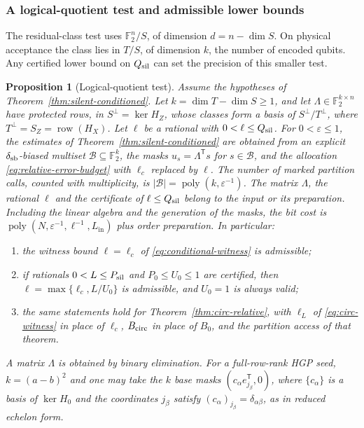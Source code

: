 \documentclass[10pt,twocolumn]{article}
\newtheorem{proposition}[theorem]{Proposition}
\theoremstyle{definition}
\newcommand{\Ftwo}{\mathbb{F}_2}
\DeclareMathOperator{\rowsp}{row}
\DeclareMathOperator{\poly}{poly}
\newcommand{\Lin}{L_{\mathrm{in}}}
\begin{document}
\subsubsection{A logical-quotient test and admissible lower bounds}
\label{sec:logical-quotient}
The residual-class test uses $\Ftwo^n/S$, of dimension $d=n-\dim S$.
On physical acceptance the class lies in $T/S$, of dimension $k$,
the number of encoded qubits. Any certified lower bound on $Q_{\rm sil}$
can set the precision of this smaller test.

\begin{proposition}[Logical-quotient test]\label{prop:logical-quotient}
Assume the hypotheses of Theorem~\ref{thm:silent-conditioned}. Let
$k=\dim T-\dim S\ge1$, and let $\Lambda\in\Ftwo^{k\times n}$ have
protected rows, in $S^\perp=\ker H_Z$, whose classes form a basis of
$S^\perp/T^\perp$, where $T^\perp=S_Z=\rowsp(H_X)$. Let $\ell$ be a
rational with $0<\ell\le Q_{\rm sil}$. For $0<\varepsilon\le1$, the
estimates of Theorem~\ref{thm:silent-conditioned} are obtained from an
explicit $\delta_{\rm sb}$-biased multiset $\mathcal B\subseteq\Ftwo^k$,
the masks $u_s=\Lambda^{\mathsf T}s$ for $s\in\mathcal B$, and the
allocation \eqref{eq:relative-error-budget} with $\ell_c$ replaced by
$\ell$. The number of marked partition calls, counted with multiplicity,
is $|\mathcal B|=\poly(k,\varepsilon^{-1})$. The matrix $\Lambda$, the
rational $\ell$ and the certificate of $\ell\le Q_{\rm sil}$ belong to
the input or its preparation. Including the linear algebra and the
generation of the masks, the bit cost is
$\poly(N,\varepsilon^{-1},\ell^{-1},\Lin)$ plus order preparation.
In particular:
\begin{enumerate}
\item[(a)] the witness bound $\ell=\ell_c$ of
\eqref{eq:conditional-witness} is admissible;
\item[(b)] if rationals $0<L\le P_{\rm sil}$ and $P_0\le U_0\le1$ are
certified, then $\ell=\max\{\ell_c,L/U_0\}$ is admissible, and $U_0=1$
is always valid;
\item[(c)] the same statements hold for
Theorem~\ref{thm:circ-relative}, with $\ell_L$ of
\eqref{eq:circ-witness} in place of $\ell_c$, $B_{\rm circ}$ in place
of $B_0$, and the partition access of that theorem.
\end{enumerate}
A matrix $\Lambda$ is obtained by binary elimination. For a
full-row-rank HGP seed, $k=(a-b)^2$ and one may take the $k$ base masks
$(c_\alpha e_{j_\beta}^{\mathsf T},0)$, where $\{c_\alpha\}$ is a basis
of $\ker H_0$ and the coordinates $j_\beta$ satisfy
$(c_\alpha)_{j_\beta}=\delta_{\alpha\beta}$, as in reduced echelon form.
\end{proposition}
\end{document}
